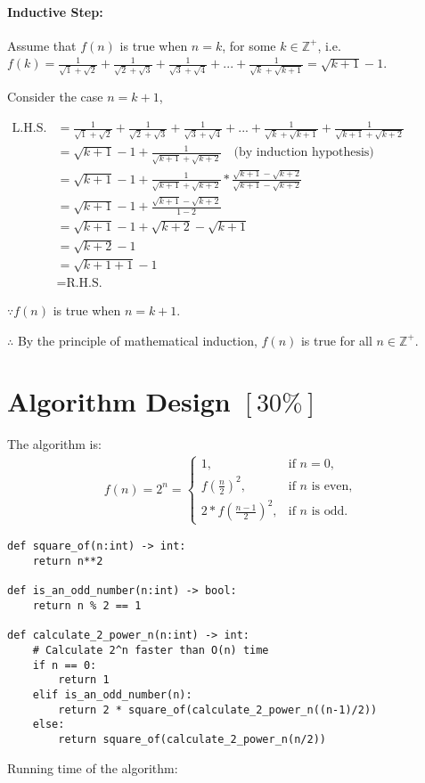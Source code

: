 \documentclass{article}
\begin{document}
\begin{enumerate}[label=(\alph*)]
\paragraph*{Inductive Step:\\}
Assume that $f(n)$ is true when $n = k$, for some $k \in \mathbb{Z}^+$, i.e. $f(k) = \frac{1}{\sqrt{1}+\sqrt{2}} + \frac{1}{\sqrt{2}+\sqrt{3}} + \frac{1}{\sqrt{3}+\sqrt{4}} + ... + \frac{1}{\sqrt{k}+\sqrt{k+1}} = \sqrt{k+1}-1$.

Consider the case $n=k+1$,

$\begin{aligned}
\text{L.H.S.} &= \frac{1}{\sqrt{1}+\sqrt{2}} + \frac{1}{\sqrt{2}+\sqrt{3}} + \frac{1}{\sqrt{3}+\sqrt{4}} + ... + \frac{1}{\sqrt{k}+\sqrt{k+1}} + \frac{1}{\sqrt{k+1}+\sqrt{k+2}} \\
&= \sqrt{k+1}-1 + \frac{1}{\sqrt{k+1}+\sqrt{k+2}} \quad \text{(by induction hypothesis)} \\
&= \sqrt{k+1}-1 + \frac{1}{\sqrt{k+1}+\sqrt{k+2}} * \frac{\sqrt{k+1}-\sqrt{k+2}}{\sqrt{k+1}-\sqrt{k+2}} \\
&= \sqrt{k+1}-1 + \frac{\sqrt{k+1}-\sqrt{k+2}}{1-2} \\
&= \sqrt{k+1}-1 + \sqrt{k+2} - \sqrt{k+1} \\
&= \sqrt{k+2} - 1 \\
&= \sqrt{k+1+1} - 1 \\
&= \text{R.H.S.}
\end{aligned}$

$\because f(n)$ is true when $n = k+1$.

$\therefore$ By the principle of mathematical induction,
$f(n)$ is true for all $n \in \mathbb{Z}^+$.

\end{enumerate}

\section{Algorithm Design $[30\%]$}

The algorithm is:
\begin{align*}
f(n) = 2^n = \begin{cases}
    1, & \text{if } n = 0, \\
    f(\frac{n}{2})^2, & \text{if } n \text{ is even}, \\
    2 * f(\frac{n-1}{2})^2, & \text{if } n \text{ is odd}.
\end{cases}
\end{align*}

\begin{verbatim}
def square_of(n:int) -> int:
    return n**2

def is_an_odd_number(n:int) -> bool:
    return n % 2 == 1

def calculate_2_power_n(n:int) -> int:
    # Calculate 2^n faster than O(n) time
    if n == 0:
        return 1
    elif is_an_odd_number(n):
        return 2 * square_of(calculate_2_power_n((n-1)/2))
    else:
        return square_of(calculate_2_power_n(n/2))
\end{verbatim}
Running time of the algorithm:
\end{document}
